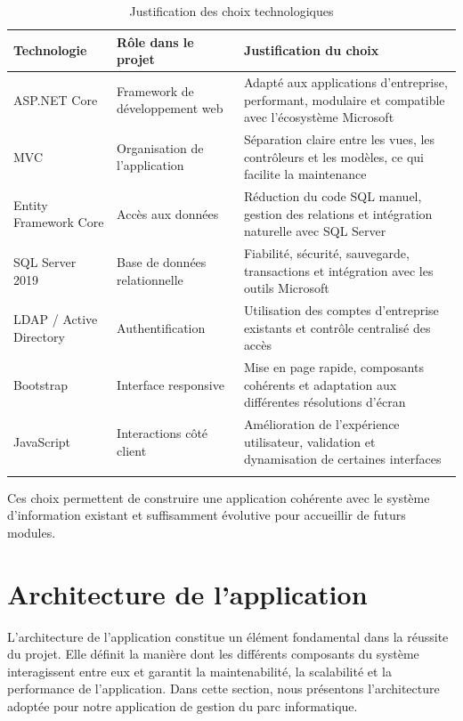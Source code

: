 \begin{longtable}{|m{3.5cm}|m{5cm}|m{5.5cm}|}
\hline
\textbf{Technologie} & \textbf{Rôle dans le projet} & \textbf{Justification du choix} \\
\hline
\endhead
\endfoot
\endlastfoot
\hline
ASP.NET Core & Framework de développement web & Adapté aux applications d'entreprise, performant, modulaire et compatible avec l'écosystème Microsoft \\
\hline
MVC & Organisation de l'application & Séparation claire entre les vues, les contrôleurs et les modèles, ce qui facilite la maintenance \\
\hline
Entity Framework Core & Accès aux données & Réduction du code SQL manuel, gestion des relations et intégration naturelle avec SQL Server \\
\hline
SQL Server 2019 & Base de données relationnelle & Fiabilité, sécurité, sauvegarde, transactions et intégration avec les outils Microsoft \\
\hline
LDAP / Active Directory & Authentification & Utilisation des comptes d'entreprise existants et contrôle centralisé des accès \\
\hline
Bootstrap & Interface responsive & Mise en page rapide, composants cohérents et adaptation aux différentes résolutions d'écran \\
\hline
JavaScript & Interactions côté client & Amélioration de l'expérience utilisateur, validation et dynamisation de certaines interfaces \\
\hline
\captionsetup{justification=centering,margin=1cm}
\caption{Justification des choix technologiques}
\end{longtable}

Ces choix permettent de construire une application cohérente avec le système d'information existant et suffisamment évolutive pour accueillir de futurs modules.
            

    

\section{Architecture de l'application}

L'architecture de l'application constitue un élément fondamental dans la réussite du projet. Elle définit la manière dont les différents composants du système interagissent entre eux et garantit la maintenabilité, la scalabilité et la performance de l'application. Dans cette section, nous présentons l'architecture adoptée pour notre application de gestion du parc informatique.

